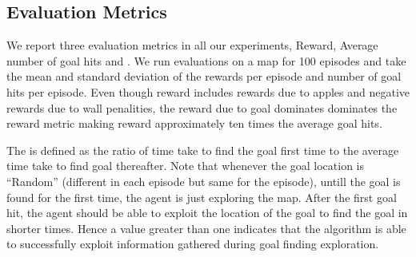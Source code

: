 \subsection{Evaluation Metrics}
We report three evaluation metrics in all our experiments, Reward, Average number of goal hits and \LatencyOneGtOne. We run evaluations on a map for 100 episodes and take the mean and standard deviation of the rewards per episode and number of goal hits per episode. Even though reward includes rewards due to apples and negative rewards due to wall penalities, the reward due to goal dominates dominates the reward metric making reward approximately ten times the average goal hits.

The \LatencyOneGtOne is defined as the ratio of time take to find the goal first time to the average time take to find goal thereafter.
Note that whenever the goal location is ``Random'' (different in each episode but same for the episode), untill the goal is found for the first time, the agent is just exploring the map.
After the first goal hit, the agent should be able to exploit the location of the goal to find the goal in shorter times.
Hence a \LatencyOneGtOne value greater than one indicates that the algorithm is able to successfully exploit information gathered during goal finding exploration.


